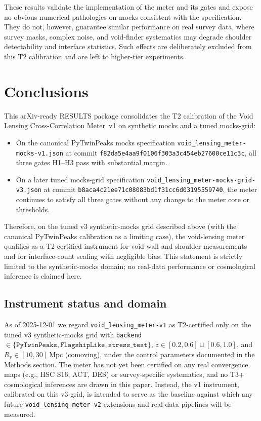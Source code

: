 \documentclass{article}
\begin{document}
These results validate the implementation of the meter and its gates
and expose no obvious numerical pathologies on mocks consistent with
the specification.
They do not, however, guarantee similar performance on real survey
data, where survey masks, complex noise, and void-finder systematics
may degrade shoulder detectability and interface statistics.
Such effects are deliberately excluded from this T2 calibration and
are left to higher-tier experiments.

\section{Conclusions}
This arXiv-ready RESULTS package consolidates the T2 calibration of the
Void Lensing Cross-Correlation Meter~v1 on synthetic mocks and a tuned
mocks-grid:

\begin{itemize}
  \item On the canonical PyTwinPeaks mocks specification
    \texttt{void\_lensing\_meter-mocks-v1.json} at commit
    \texttt{f82da5e4aa9f0106f303a3c454eb27600ce11c3c},
    all three gates H1--H3 pass with substantial margin.
  \item On a later tuned mocks-grid specification
    \texttt{void\_lensing\_meter-mocks-grid-v3.json} at commit
    \texttt{b8aca4c21ee71c08083bd1f31cc6d03195559740},
    the meter continues to satisfy all three gates without any change
    to the meter core or thresholds.
\end{itemize}

Therefore, on the tuned v3 synthetic-mocks grid described above (with
the canonical PyTwinPeaks calibration as a limiting case), the
void-lensing meter qualifies as a T2-certified instrument for
void-wall and shoulder measurements and for interface-count scaling
with negligible bias. This statement is strictly limited to the
synthetic-mocks domain; no real-data performance or cosmological
inference is claimed here.

\subsection*{Instrument status and domain}
As of 2025-12-01 we regard \texttt{void\_lensing\_meter-v1} as
T2-certified only on the tuned v3 synthetic-mocks grid with
\texttt{backend}~$\in\{\texttt{PyTwinPeaks},\texttt{FlagshipLike},\texttt{stress\_test}\}$,
$z\in[0.2,0.6]\cup[0.6,1.0]$, and
$R_v\in[10,30]~\mathrm{Mpc}$ (comoving), under the control parameters
documented in the Methods section. The meter has not yet been certified
on any real convergence maps (e.g., HSC S16, ACT, DES) or survey-specific
systematics, and no T3+ cosmological inferences are drawn in this paper.
Instead, the v1 instrument, calibrated on this v3 grid, is intended to
serve as the baseline against which any future
\texttt{void\_lensing\_meter-v2} extensions and real-data pipelines will
be measured.
\end{document}
